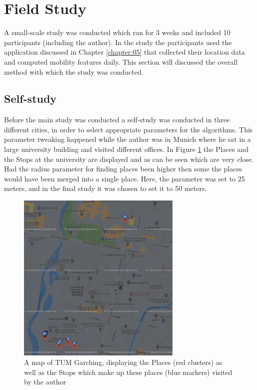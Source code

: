 \section{Field Study}
A small-scale study was conducted which ran for 3 weeks and included 10 participants (including the author). In the study the participants used the application discussed in Chapter \ref{chapter:05} that collected their location data and computed mobility features daily. This section will discussed the overall method with which the study was conducted.

\subsection{Self-study}
Before the main study was conducted a self-study was conducted in three different cities, in order to select appropriate parameters for the algorithms. This parameter tweaking happened while the author was in Munich where he sat in a large university building and visited different offices. In Figure \ref{fig:tum-map} the Places and the Stops at the university are displayed and as can be seen which are very close. Had the radius parameter for finding places been higher then some the places would have been merged into a single place. Here, the parameter was set to 25 meters, and in the final study it was chosen to set it to 50 meters.

\begin{figure}
    \centering
    \includegraphics[width=0.7\textwidth]{images/map/map-tum.png}
    \caption{A map of TUM Garching, displaying the Places (red clusters) as well as the Stops which make up these places (blue markers) visited by the author}
    \label{fig:tum-map}
\end{figure}

